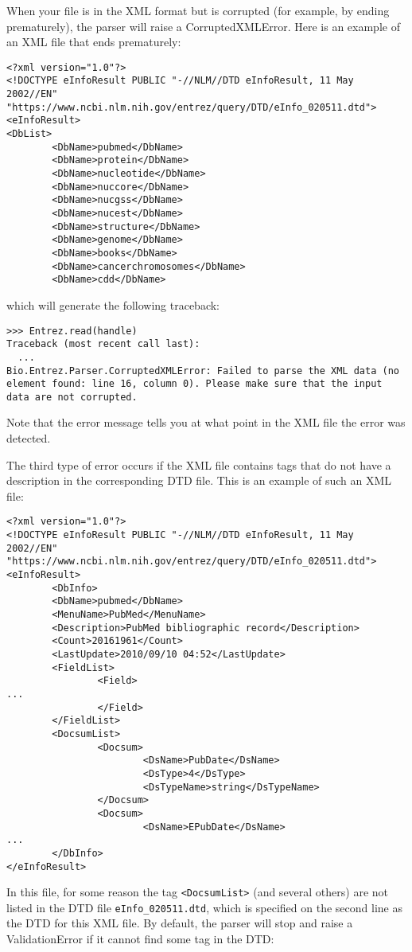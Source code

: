 When your file is in the XML format but is corrupted (for example, by ending prematurely), the parser will raise a CorruptedXMLError.
Here is an example of an XML file that ends prematurely:
\begin{verbatim}
<?xml version="1.0"?>
<!DOCTYPE eInfoResult PUBLIC "-//NLM//DTD eInfoResult, 11 May 2002//EN" "https://www.ncbi.nlm.nih.gov/entrez/query/DTD/eInfo_020511.dtd">
<eInfoResult>
<DbList>
        <DbName>pubmed</DbName>
        <DbName>protein</DbName>
        <DbName>nucleotide</DbName>
        <DbName>nuccore</DbName>
        <DbName>nucgss</DbName>
        <DbName>nucest</DbName>
        <DbName>structure</DbName>
        <DbName>genome</DbName>
        <DbName>books</DbName>
        <DbName>cancerchromosomes</DbName>
        <DbName>cdd</DbName>
\end{verbatim}
which will generate the following traceback:
\begin{verbatim}
>>> Entrez.read(handle)
Traceback (most recent call last):
  ...
Bio.Entrez.Parser.CorruptedXMLError: Failed to parse the XML data (no element found: line 16, column 0). Please make sure that the input data are not corrupted.
\end{verbatim}
Note that the error message tells you at what point in the XML file the error was detected.

The third type of error occurs if the XML file contains tags that do not have a description in the corresponding DTD file. This is an example of such an XML file:

\begin{verbatim}
<?xml version="1.0"?>
<!DOCTYPE eInfoResult PUBLIC "-//NLM//DTD eInfoResult, 11 May 2002//EN" "https://www.ncbi.nlm.nih.gov/entrez/query/DTD/eInfo_020511.dtd">
<eInfoResult>
        <DbInfo>
        <DbName>pubmed</DbName>
        <MenuName>PubMed</MenuName>
        <Description>PubMed bibliographic record</Description>
        <Count>20161961</Count>
        <LastUpdate>2010/09/10 04:52</LastUpdate>
        <FieldList>
                <Field>
...
                </Field>
        </FieldList>
        <DocsumList>
                <Docsum>
                        <DsName>PubDate</DsName>
                        <DsType>4</DsType>
                        <DsTypeName>string</DsTypeName>
                </Docsum>
                <Docsum>
                        <DsName>EPubDate</DsName>
...
        </DbInfo>
</eInfoResult>
\end{verbatim}

In this file, for some reason the tag \verb|<DocsumList>| (and several others) are not listed in the DTD file \verb|eInfo_020511.dtd|, which is specified on the second line as the DTD for this XML file. By default, the parser will stop and raise a ValidationError if it cannot find some tag in the DTD:

